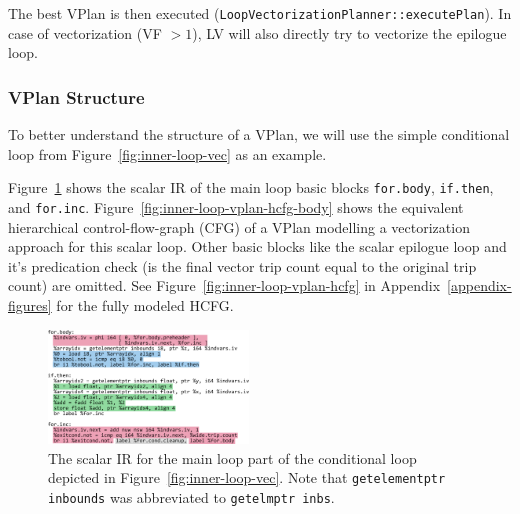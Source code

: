 \documentclass[sigplan,11pt,nonacm]{acmart}
\begin{document}
The best VPlan is then executed (\texttt{LoopVectorizationPlanner::\allowbreak executePlan}). In case of
vectorization (VF $>1$), LV will also directly try to vectorize the epilogue loop.

\subsubsection{VPlan Structure}
To better understand the structure of a VPlan, we will use the
simple conditional loop from Figure~\ref{fig:inner-loop-vec} as an example.

Figure~\ref{fig:inner-loop-scalar-ir} shows the scalar IR of the main loop basic blocks \texttt{for.body},
\texttt{if.then}, and \texttt{for.inc}. Figure~\ref{fig:inner-loop-vplan-hcfg-body} shows the equivalent
hierarchical control-flow-graph (CFG) of a VPlan modelling a vectorization approach for this 
scalar loop. Other basic blocks like the scalar epilogue loop and it's predication check (is the final
vector trip count equal to the original trip count) are omitted. See Figure~\ref{fig:inner-loop-vplan-hcfg}
in Appendix~\ref{appendix-figures} for the fully modeled HCFG.


\begin{figure}
  \centering
  \includegraphics[width=0.475\textwidth]{images/inner-loop-scalar-loop-ir-color.png}
  \caption{The scalar IR for the main loop part of the conditional loop depicted in
  Figure~\ref{fig:inner-loop-vec}. Note that \texttt{getelementptr inbounds}
  was abbreviated to \texttt{getelmptr inbs}.}
  \label{fig:inner-loop-scalar-ir}
\end{figure}
\end{document}

